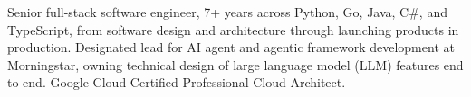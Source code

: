 
\begin{cvparagraph}
Senior full-stack software engineer, 7+ years across Python, Go, Java, C\#, and TypeScript, from software design and architecture through launching products in production. Designated lead for AI agent and agentic framework development at Morningstar, owning technical design of large language model (LLM) features end to end. Google Cloud Certified Professional Cloud Architect.
\end{cvparagraph}
